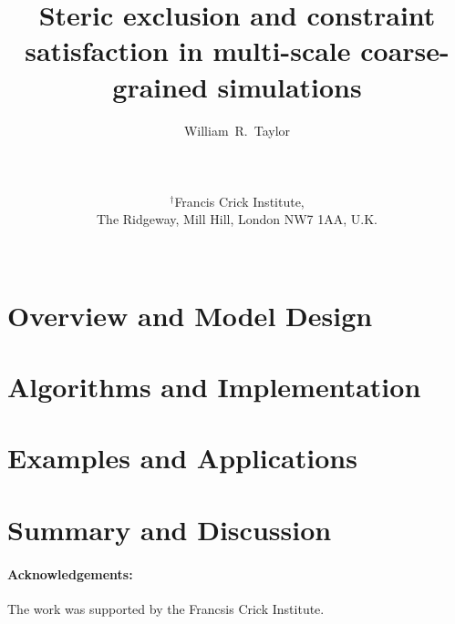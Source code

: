 \documentclass[12pt]{article}
\begin{document}
\title{\bf Steric exclusion and constraint satisfaction in multi-scale coarse-grained simulations
}

\author{
William~R.~Taylor\\ \\ \\ \\
$^\dagger$Francis Crick Institute,\\
The Ridgeway, Mill Hill, London NW7 1AA, U.K.\\ \\ 
}
\begin{singlespace}
\maketitle
\end{singlespace}
\clearpage
%
\section{Overview and Model Design}

\clearpage
\section{Algorithms and Implementation}

\clearpage

\clearpage

\clearpage
\section{Examples and Applications}


\clearpage
\section{Summary and Discussion}

\clearpage
\begin{singlespace}


\paragraph{Acknowledgements:}
The work was supported by the Francsis Crick Institute.
\clearpage
%
\end{singlespace}
\end{document}
